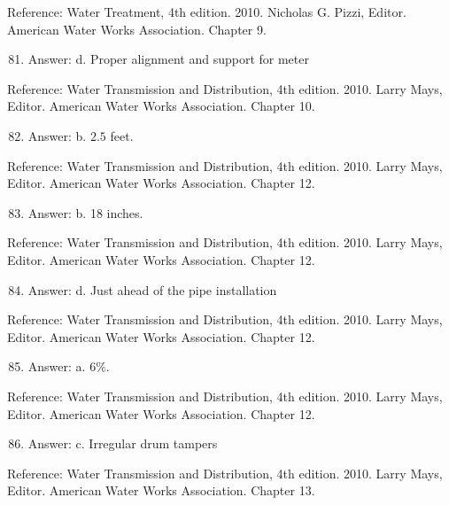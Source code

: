 \documentclass[10pt]{article}
\begin{document}
Reference: Water Treatment, 4th edition. 2010. Nicholas G. Pizzi, Editor. American Water Works Association. Chapter 9.

\begin{enumerate}
  \setcounter{enumi}{80}
  \item Answer: d. Proper alignment and support for meter
\end{enumerate}

Reference: Water Transmission and Distribution, 4th edition. 2010. Larry Mays, Editor. American Water Works Association. Chapter 10.

\begin{enumerate}
  \setcounter{enumi}{81}
  \item Answer: b. $2.5$ feet.
\end{enumerate}

Reference: Water Transmission and Distribution, 4th edition. 2010. Larry Mays, Editor. American Water Works Association. Chapter 12.

\begin{enumerate}
  \setcounter{enumi}{82}
  \item Answer: b. 18 inches.
\end{enumerate}

Reference: Water Transmission and Distribution, 4th edition. 2010. Larry Mays, Editor. American Water Works Association. Chapter 12.

\begin{enumerate}
  \setcounter{enumi}{83}
  \item Answer: d. Just ahead of the pipe installation
\end{enumerate}

Reference: Water Transmission and Distribution, 4th edition. 2010. Larry Mays, Editor. American Water Works Association. Chapter 12.

\begin{enumerate}
  \setcounter{enumi}{84}
  \item Answer: a. $6 \%$.
\end{enumerate}

Reference: Water Transmission and Distribution, 4th edition. 2010. Larry Mays, Editor. American Water Works Association. Chapter 12.

\begin{enumerate}
  \setcounter{enumi}{85}
  \item Answer: c. Irregular drum tampers
\end{enumerate}

Reference: Water Transmission and Distribution, 4th edition. 2010. Larry Mays, Editor. American Water Works Association. Chapter 13.
\end{document}
